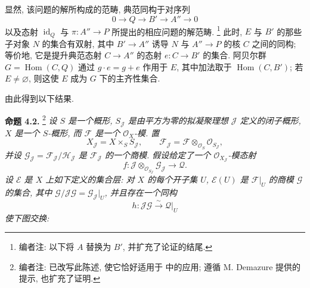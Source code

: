 \begin{center}
\end{center}

显然, 该问题的解所构成的范畴, 典范同构于对序列
\[
 0\longrightarrow Q\longrightarrow B'\longrightarrow A''\longrightarrow0
\]
以及态射 \(\operatorname{id}_Q\) 与 \(\pi:A''\to P\)
所提出的相应问题的解范畴.
\footnote{编者注: 以下将 \(A\) 替换为 \(B'\),
并扩充了论证的结尾.}
此时, \(E\) 与 \(B'\) 的那些子对象 \(N\) 的集合有双射,
其中 \(B'\to A''\) 诱导 \(N\) 与 \(A''\to P\) 的核 \(C\) 之间的同构;
等价地, 它是提升典范态射 \(C\to A''\) 的态射 \(e:C\to B'\) 的集合.
阿贝尔群 \(G=\operatorname{Hom}(C,Q)\) 通过
\(g\cdot e=g+e\) 作用于 \(E\),
其中加法取于 \(\operatorname{Hom}(C,B')\);
若 \(E\ne\varnothing\), 则这使 \(E\) 成为 \(G\) 下的主齐性集合.

由此得到以下结果.

\medskip
\noindent{}\textbf{命题 4.2.}
\footnote{编者注: 已改写此陈述, 使它恰好适用于
 中的应用;
遵循 M. Demazure 提供的提示, 也扩充了证明.}
\textit{设 \(S\) 是一个概形,
\(S_{\mathscr J}\) 是由平方为零的拟凝聚理想 \(\mathscr J\) 定义的闭子概形,
\(X\) 是一个 \(S\)-概形, 而 \(\mathscr F\) 是一个
\(\mathscr O_X\)-模. 置
\[
 X_{\mathscr J}=X\times_S S_{\mathscr J},\qquad
 \mathscr F_{\mathscr J}
 =\mathscr F\otimes_{\mathscr O_S}\mathscr O_{S_{\mathscr J}},
\]
并设
\(\mathscr G_{\mathscr J}=\mathscr F_{\mathscr J}/\mathscr H_{\mathscr J}\)
是 \(\mathscr F_{\mathscr J}\) 的一个商模.
假设给定了一个 \(\mathscr O_{X_{\mathscr J}}\)-模态射
\[
 f:\mathscr J\otimes_{\mathscr O_{S_{\mathscr J}}}
       \mathscr G_{\mathscr J}\longrightarrow\mathscr Q.
\]
设 \(\mathcal E\) 是 \(X\) 上如下定义的集合层:
对 \(X\) 的每个开子集 \(U\), \(\mathcal E(U)\) 是
\(\mathscr F|_U\) 的商模 \(\mathscr G\) 的集合,
其中 \(\mathscr G/\mathscr J\mathscr G=\mathscr G_{\mathscr J}|_U\),
并且存在一个同构
\[
 h:\mathscr J\mathscr G\xrightarrow{\sim}\mathscr Q|_U
\]
使下图交换:}

\begin{center}
\end{center}

